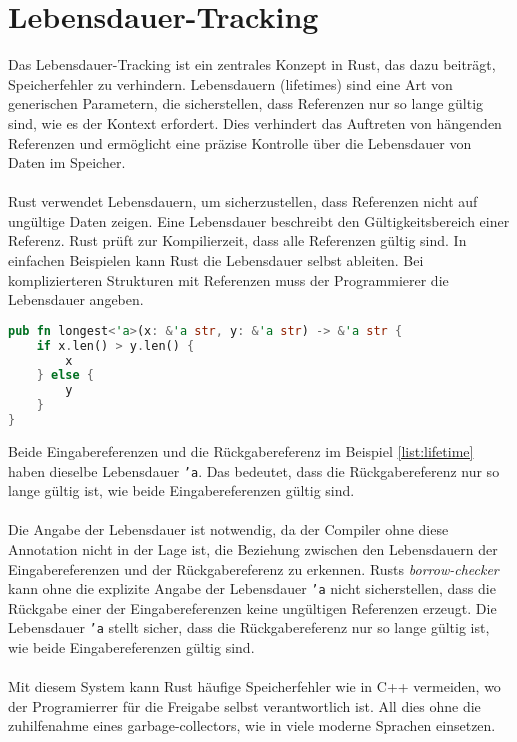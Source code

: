 \chapter{Lebensdauer-Tracking}

Das Lebensdauer-Tracking ist ein zentrales Konzept in Rust, das dazu beiträgt, Speicherfehler zu verhindern. 
Lebensdauern (lifetimes) sind eine Art von generischen Parametern, die sicherstellen, dass Referenzen nur so lange gültig sind, wie es der Kontext erfordert. 
Dies verhindert das Auftreten von hängenden Referenzen und ermöglicht eine präzise Kontrolle über die Lebensdauer von Daten im Speicher.\\
\\
Rust verwendet Lebensdauern, um sicherzustellen, dass Referenzen nicht auf ungültige Daten zeigen.
Eine Lebensdauer beschreibt den Gültigkeitsbereich einer Referenz. 
Rust prüft zur Kompilierzeit, dass alle Referenzen gültig sind. 
In einfachen Beispielen kann Rust die Lebensdauer selbst ableiten. 
Bei komplizierteren Strukturen mit Referenzen muss der Programmierer die Lebensdauer angeben.

\begin{lstlisting}[language=Rust, caption={Expliziete lifetime}, label=list:lifetime]
pub fn longest<'a>(x: &'a str, y: &'a str) -> &'a str {
    if x.len() > y.len() {
        x
    } else {
        y
    }
}
\end{lstlisting}
\noindent
Beide Eingabereferenzen und die Rückgabereferenz im Beispiel \ref{list:lifetime} haben dieselbe Lebensdauer \texttt{'a}. 
Das bedeutet, dass die Rückgabereferenz nur so lange gültig ist, wie beide Eingabereferenzen gültig sind.\\
\\
Die Angabe der Lebensdauer ist notwendig, da der Compiler ohne diese Annotation nicht in der Lage ist, die Beziehung zwischen den Lebensdauern der Eingabereferenzen und der Rückgabereferenz zu erkennen. 
Rusts \textit{\gls{borrow-checker}} kann ohne die explizite Angabe der Lebensdauer \texttt{'a} nicht sicherstellen, dass die Rückgabe einer der Eingabereferenzen keine ungültigen Referenzen erzeugt. 
Die Lebensdauer \texttt{'a} stellt sicher, dass die Rückgabereferenz nur so lange gültig ist, wie beide Eingabereferenzen gültig sind.\\
\\
Mit diesem System kann Rust häufige Speicherfehler wie in C++ vermeiden, wo der Programierrer für die Freigabe selbst verantwortlich ist.
All dies ohne die zuhilfenahme eines garbage-collectors, wie in viele moderne Sprachen einsetzen.
